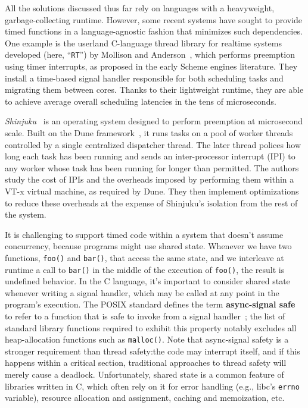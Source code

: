 All the solutions discussed thus far rely on languages with a heavyweight,
garbage-collecting runtime.  However, some recent systems have sought
to provide timed functions in a language-agnostic fashion that minimizes such
dependencies.  One example is the userland C-language thread library for realtime
systems developed (here, ``\texttt{RT}'') by Mollison and
Anderson~\cite{mollison:rtas2013}, which performs
preemption using timer interrupts, as proposed in the early Scheme engines
literature.  They install a time-based signal handler responsible for both scheduling
tasks and migrating them between cores.  Thanks to their lightweight runtime, they
are able to achieve average overall scheduling latencies in the tens of microseconds.


\textit{Shinjuku}~\cite{Kaffes:nsdi2019} is an operating system designed to perform
preemption at microsecond scale.  Built on the Dune framework~\cite{Belay:osdi2012},
it runs tasks on a pool of worker threads controlled by a single centralized
dispatcher thread.  The later thread polices how long each task has been running and
sends an inter-processor interrupt (IPI) to any worker whose task has been running
for longer than permitted.  The authors study the cost of IPIs and the overheads
imposed by performing them within a VT-x virtual machine, as required by Dune.  They
then implement optimizations to reduce these overheads at the expense of Shinjuku's
isolation from the rest of the system.

It is challenging to support timed code within a system that doesn't assume
concurrency, because programs might use shared state.  Whenever we have two
functions,
\texttt{foo()} and \texttt{bar()}, that access the same state, and we interleave at
runtime a call to \texttt{bar()} in the middle of the execution of \texttt{foo()},
the result is undefined behavior.  In the C language, it's important to consider
shared state whenever writing a signal handler, which may be called at any point
in the program's execution.  The POSIX standard defines the term \textbf{async-signal
safe} to
refer to a function that is safe to invoke from a signal
handler~\cite{signal-safety-manpage}; the list of standard library functions required
to exhibit this property notably excludes all heap-allocation functions such as
\texttt{malloc()}.  Note that async-signal safety is a stronger requirement than
thread safety:\@ the code may interrupt itself, and if this happens within a critical
section, traditional approaches to thread safety will merely cause a deadlock.
Unfortunately, shared state is a common feature of libraries written in C, which
often rely on it for error handling (e.g., libc's \texttt{errno} variable), resource
allocation and assignment, caching and memoization, etc.

